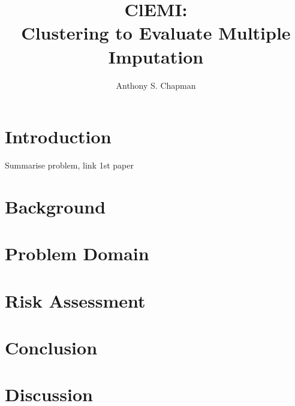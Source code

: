 \documentclass{article}
\title{ClEMI: \\ Clustering to Evaluate Multiple Imputation}
\author{Anthony S. Chapman}
\begin{document}
 
	\maketitle{} 
	\section{Introduction} %
	\label{sec:introduction}
	Summarise problem, link 1st paper

	\section{Background} %
	\label{sec:background}
	

	\section{Problem Domain} %
	\label{sec:problem_domain}
	

	\section{Risk Assessment} %
	\label{sec:risk_assessment}
	

	\section{Conclusion} %
	\label{sec:conclusion}
	

	\section{Discussion} %
	\label{sec:discussion}
	
\end{document}
